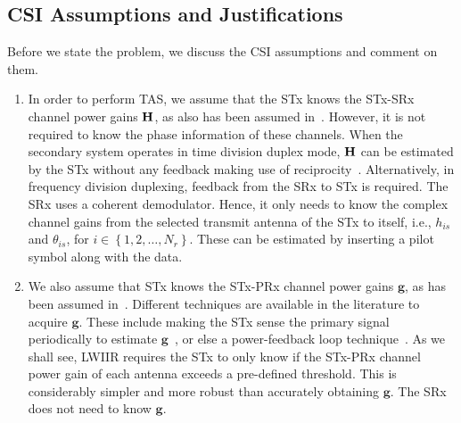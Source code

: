 \documentclass[12pt,draftcls,peerreview,onecolumn]{IEEEtran}
\newcommand{\ie}{{i.e.}}
\newcommand{\mtx}[1]{{\bf #1}} %
\newcommand{\Nr}{{N_r}}
\newcommand{\such}{h}
\newcommand{\puch}{g}
\newcommand{\hk}[1]{{\such_{#1}}}
\newcommand{\g}{\mathbf{\puch}}
\newcommand{\nropts}{\left\{1,2,\ldots,\Nr\right\}}
\newcommand{\suchph}{\theta}
\newcommand{\thetahk}{\suchph_{is}}
\newcommand{\Hmx}{\mtx{H}}
\begin{document}
\subsection{CSI Assumptions and Justifications}  
Before we state the problem, we discuss the  CSI assumptions and comment on them. 
\begin{enumerate}
\item In order to perform TAS, we assume that the STx knows the STx-SRx channel power gains $\Hmx$, as also has been assumed in~\cite{XKang_2011_JSAC,Hanif_2015_globecom,Sarvendranath_2013_TCOM,Kong_2011_JCN,Wang_2010_TWC,RZhang_2009_TWC}. However, it is not required to know the phase information of these channels. When the secondary system operates in time division duplex mode, $\Hmx$ can be estimated by the STx without any feedback making use of reciprocity~\cite{Sarvendranath_2013_TCOM}. Alternatively, in frequency division duplexing, feedback from the SRx to STx is required. The SRx uses a coherent demodulator. Hence, it only needs to know the complex channel gains from the selected transmit antenna of the STx to itself, \ie, $\hk{is}$ and $\thetahk$, for $i\in\nropts$. These can be estimated by inserting a pilot symbol along with the data. 

\item We also assume that STx knows the STx-PRx channel power gains $\g$, as has been assumed in~\cite{Hanif_2015_globecom,Sarvendranath_2013_TCOM,Kong_2011_JCN,Wang_2010_TWC,RZhang_2009_TWC}. Different techniques are available in the literature to acquire $\g$. These include making the STx sense the primary signal periodically to estimate $\g$~\cite{Zhao_2008_TSP}, or else a power-feedback loop technique~\cite{RZhang_2008_DSAN}. As we shall see, LWIIR  requires the STx to only know if the STx-PRx channel power gain of each antenna exceeds a pre-defined threshold. This is considerably simpler and more robust than accurately obtaining $\g$. The SRx does not need to know $\g$. 


\end{enumerate}
\end{document}
